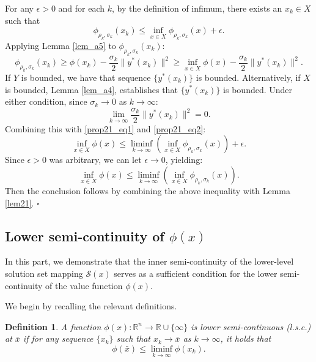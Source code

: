 \documentclass{article}
\newtheorem{definition}[theorem]{Definition}
\newenvironment{proof}[1][Proof]{\par
	\normalfont\topsep6pt\relax
	\trivlist\item[\hskip\labelsep\itshape #1.]\ignorespaces
}{%
	\hfill\ensuremath{\square}\endtrivlist
}
\begin{document}
\begin{proof}[Proof of Proposition \ref{prop21}]
For any $\epsilon > 0$ and for each $k$, by the definition of infimum, there exists an $x_k \in X$ such that
\begin{equation}\label{prop21_eq1}
     \phi_{\rho_k, \sigma_k}(x_k) \le \inf_{ x\in {X}}\phi_{\rho_k, \sigma_k}(x)+ \epsilon.
\end{equation}
Applying Lemma \ref{lem_a5} to $\phi_{\rho_k, \sigma_k}(x_k)$:
\begin{equation}\label{prop21_eq2}
    \phi_{\rho_k, \sigma_k}(x_k) \ge \phi(x_k)- \frac{\sigma_k}{2}\|y^*(x_k)\|^2 \ge  \inf_{ x\in {X}} \phi(x)- \frac{\sigma_k}{2}\|y^*(x_k)\|^2.
\end{equation}
If $Y$ is bounded, we have that sequence $\{y^*(x_k)\}$ is bounded. Alternatively, if $X$ is bounded, Lemma \ref{lem_a4}, establishes that $\{y^*(x_k)\}$ is bounded. Under either condition, since $\sigma_k \rightarrow 0$ as $k \rightarrow \infty$:
\[
\lim_{k \rightarrow \infty}\frac{\sigma_k}{2}\|y^*(x_k)\|^2 = 0.
\]
Combining this with \eqref{prop21_eq1} and \eqref{prop21_eq2}:
\[
\inf_{ x\in {X}} \phi(x) \le \liminf_{k \rightarrow \infty}\left(\inf_{ x\in {X}}\phi_{\rho_k, \sigma_k}(x)\right)  + \epsilon.
\]
Since $\epsilon > 0$ was arbitrary, we can let $\epsilon \rightarrow 0$, yielding:
\[
\inf_{ x\in {X}} \phi(x) \le \liminf_{k \rightarrow \infty}\left(\inf_{ x\in {X}}\phi_{\rho_k, \sigma_k}(x)\right) .
\]
Then the conclusion follows by combining the above inequality with Lemma \ref{lem21}.
\end{proof}

\subsection{Lower semi-continuity of $\phi(x)$}\label{lsc_phi}
 In this part, we demonstrate that the inner semi-continuity of the lower-level solution set mapping $\mathcal{S}(x)$ serves as a sufficient condition for the lower semi-continuity of the value function $\phi(x)$.

We begin by recalling the relevant definitions.

 \begin{definition}
      A function $\phi(x): \mathbb{R}^n \rightarrow \mathbb{R}\cup \{\infty\}$ is lower semi-continuous (l.s.c.) at $\bar{x}$ if for any sequence $\{x_k\}$ such that $x_k \rightarrow \bar{x}$ as $k \rightarrow \infty$, it holds that $$\phi(\bar{x}) \le \liminf_{k \rightarrow \infty} \phi(x_k).$$
 \end{definition}
\end{document}
